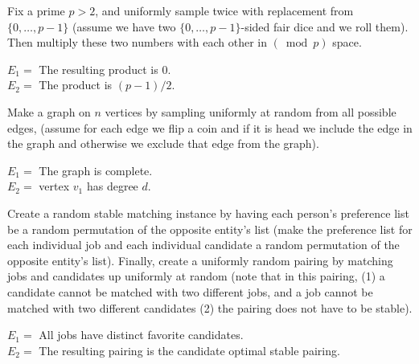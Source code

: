 \documentclass[11pt]{article}
\begin{document}
\begin{Parts}
    \Part Fix a prime $p>2$, and uniformly sample twice with replacement from
    $\{0, \dots, p-1\}$ (assume we have two $\{0, \dots, p-1\}$-sided fair dice 
    and we roll them). Then multiply these two numbers with each other in
    $(\bmod{p})$ space.\\
    \begin{center}
    $E_1 =$ The resulting product is $0$.\\
    $E_2 =$ The product is $(p-1)/2$.
    \end{center}

    \Part Make a graph on $n$ vertices by sampling uniformly at random from all 
    possible edges, (assume for each edge we flip a coin and if it is head we 
    include the edge in the graph and otherwise we exclude that edge from the 
    graph).
    \\
    \begin{center}
    $E_1 =$ The graph is complete.\\
    $E_2 =$ vertex $v_1$ has degree $d$.
    \end{center}

    \Part Create a random stable matching instance by having each person's
    preference list be a random permutation of the opposite entity's list (make 
    the preference list for each individual job and each individual candidate a 
    random permutation of the opposite entity's list). Finally, create a uniformly 
    random pairing by matching jobs and candidates up uniformly at random (note 
    that in this pairing, (1) a candidate cannot be matched with two different 
    jobs, and a job cannot be matched with two different candidates (2) the 
    pairing does not have to be stable).
    \\
    \begin{center}
     $E_1 =$ All jobs have distinct favorite candidates.\\
     $E_2 =$ The resulting pairing is the candidate optimal stable pairing.
    \end{center}

\end{Parts}
\end{document}
